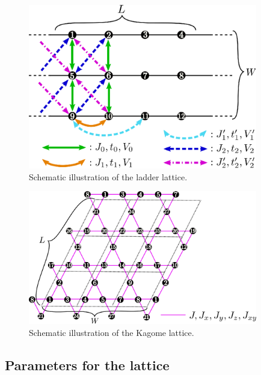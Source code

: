 \begin{itemize}
\begin{figure}[!htbp]
  \begin{center}
    \includegraphics[width=10cm]{../figs/ladder.eps}
    \caption{Schematic illustration of the ladder lattice.
    }
    \label{fig_ladder}
  \end{center}
\end{figure}

\begin{figure}[!htbp]
  \begin{center}
    \includegraphics[width=10cm]{../figs/kagome.eps}
    \caption{Schematic illustration of the Kagome lattice.
    }
    \label{fig_kagome}
  \end{center}
\end{figure}

\end{itemize}

\subsection{Parameters for the lattice}

